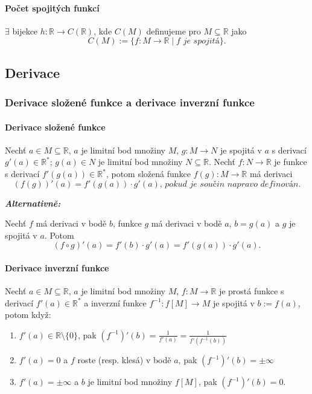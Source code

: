 \documentclass[10pt,a4paper]{article}
\newcommand{\R}{{\mathbb{R}}}
\begin{document}
\paragraph*{Počet spojitých funkcí} $\exists$ bijekce $h: \R\to C(\R)$, kde $C(M)$ definujeme pro $M \subseteq \R$ jako $$C(M):= \{f:M \to \R \mid f \textit{ je spojitá}\}.$$

\subsection{Derivace}

\subsubsection{Derivace složené funkce a derivace inverzní funkce}

\paragraph*{Derivace složené funkce} Nechť $a\in M\subseteq \R$, $a$ je limitní bod množiny $M$, $g:M\to N$ je spojitá v $a$ s derivací $g'(a)\in \R^*$; $g(a)\in N$ je limitní bod množiny $N\subseteq \R$. 
Nechť $f:N\to \R$ je funkce s derivací $f'(g(a))\in \R^*$, potom složená funkce $f(g):M\to \R$ má derivaci
$$(f(g))'(a) = f'(g(a))\cdot g'(a) \textit{, pokud je součin napravo definován.}$$

\textit{\textbf{Alternativně:}}

Nechť $f$ má derivaci v bodě $b$, funkce $g$ má derivaci v bodě $a$, $b = g(a)$ a $g$ je spojitá v $a$. Potom $$(f\circ g)'(a) = f'(b) \cdot g'(a) = f'(g(a))\cdot g'(a).$$

\paragraph*{Derivace inverzní funkce} Nechť $a\in M\subseteq \R$, $a$ je limitní bod množiny $M$, $f:M\to \R$ je prostá funkce s derivací $f'(a)\in \R^*$ a inverzní funkce $f^{-1}:f[M]\to M$ je spojitá v $b:=f(a)$, potom když:
\begin{enumerate}
    \item $f'(a)\in \R \setminus \{0\}$, pak $\displaystyle(f^{-1})'(b)=\frac{1}{f'(a)} = \frac{1}{f'(f^{-1}(b))}$
    \item $f'(a)=0$ a $f$ roste (resp. klesá) v bodě $a$, pak $\displaystyle(f^{-1})'(b) = \pm \infty$
    \item $f'(a)=\pm \infty$ a $b$ je limitní bod množiny $f[M]$, pak $\displaystyle(f^{-1})'(b) = 0 $.
\end{enumerate}
\end{document}
